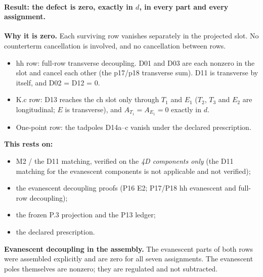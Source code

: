 \paragraph{Result: the defect is zero, exactly in $d$, in every part and every assignment.}
\textbf{Why it is zero.} Each surviving row vanishes separately in the projected slot. No counterterm cancellation
is involved, and no cancellation between rows.
\begin{itemize}
\item[(i)] hh row: full-row transverse decoupling. D01 and D03 are each nonzero in the slot and cancel each other
  (the p17/p18 transverse sum). D11 is transverse by itself, and D02 = D12 = 0.
\item[(ii)] K.c row: D13 reaches the ch slot only through $T_1$ and $E_1$ ($T_2$, $T_3$ and $E_2$ are longitudinal;
  $E$ is transverse), and $A_{T_1}=A_{E_1}=0$ exactly in $d$.
\item[(iii)] One-point row: the tadpoles D14a--c vanish under the declared prescription.
\end{itemize}
\textbf{This rests on:}
\begin{itemize}
\item M2 / the D11 matching, verified on the \emph{4D components only} (the D11 matching for the evanescent
  components is not applicable and not verified);
\item the evanescent decoupling proofs (P16 E2; P17/P18 hh evanescent and full-row decoupling);
\item the frozen P.3 projection and the P13 ledger;
\item the declared prescription.
\end{itemize}
\textbf{Evanescent decoupling in the assembly.} The evanescent parts of both rows were assembled explicitly and are
zero for all seven assignments. The evanescent poles themselves are nonzero; they are regulated and not subtracted.

